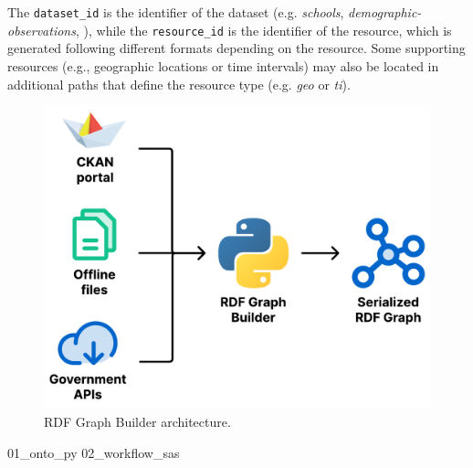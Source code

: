 The \verb#dataset_id# is the identifier of the dataset (e.g. \textit{schools}, \textit{demographic-observations}, \etc), while the \verb#resource_id# is the identifier of the resource, which is generated following different formats depending on the resource. Some supporting resources (e.g., geographic locations or time intervals) may also be located in additional paths that define the resource type (e.g. \textit{geo} or \textit{ti}).

\begin{figure}[!ht]
  \centering
  \includegraphics[width=0.6\columnwidth]{images/ontoim/rdf-graph-builder}
  \caption{\ac{RDF} Graph Builder architecture.}
  \label{fig:rdf-builder-architecture}
\end{figure}

{01_onto_py}%
{02_workflow_sas}%